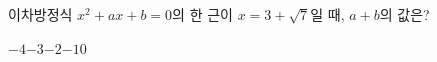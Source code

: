이차방정식 $x^2+ax+b=0$의 한 근이 $x=3+\sqrt{7}$일 때, $a+b$의 값은? 
\begin{choices32}{$-4$}{$-3$}{$-2$}{$-1$}{$0$}\end{choices32}
